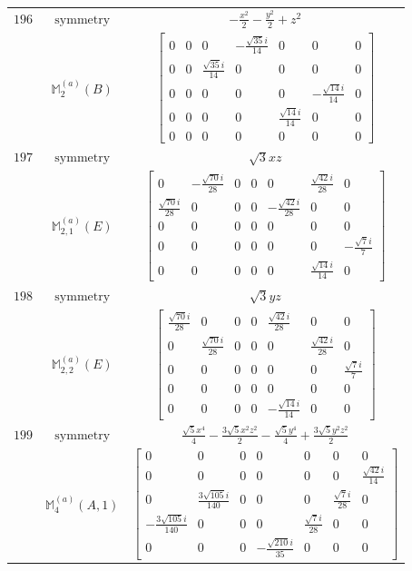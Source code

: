 \documentclass[fleqn,8pt,landscape]{jsarticle}
\begin{document}
\begin{longtable}{ccc}
$ 196 $ & $ \text{symmetry} $ & $ - \frac{x^{2}}{2} - \frac{y^{2}}{2} + z^{2} $ \\
$  $ & $ \mathbb{M}_{2}^{(a)}(B) $ & $ \begin{bmatrix} 0 & 0 & 0 & - \frac{\sqrt{35} i}{14} & 0 & 0 & 0 \\ 0 & 0 & \frac{\sqrt{35} i}{14} & 0 & 0 & 0 & 0 \\ 0 & 0 & 0 & 0 & 0 & - \frac{\sqrt{14} i}{14} & 0 \\ 0 & 0 & 0 & 0 & \frac{\sqrt{14} i}{14} & 0 & 0 \\ 0 & 0 & 0 & 0 & 0 & 0 & 0 \end{bmatrix} $ \\ \hline
$ 197 $ & $ \text{symmetry} $ & $ \sqrt{3} x z $ \\
$  $ & $ \mathbb{M}_{2,1}^{(a)}(E) $ & $ \begin{bmatrix} 0 & - \frac{\sqrt{70} i}{28} & 0 & 0 & 0 & \frac{\sqrt{42} i}{28} & 0 \\ \frac{\sqrt{70} i}{28} & 0 & 0 & 0 & - \frac{\sqrt{42} i}{28} & 0 & 0 \\ 0 & 0 & 0 & 0 & 0 & 0 & 0 \\ 0 & 0 & 0 & 0 & 0 & 0 & - \frac{\sqrt{7} i}{7} \\ 0 & 0 & 0 & 0 & 0 & \frac{\sqrt{14} i}{14} & 0 \end{bmatrix} $ \\ \hline
$ 198 $ & $ \text{symmetry} $ & $ \sqrt{3} y z $ \\
$  $ & $ \mathbb{M}_{2,2}^{(a)}(E) $ & $ \begin{bmatrix} \frac{\sqrt{70} i}{28} & 0 & 0 & 0 & \frac{\sqrt{42} i}{28} & 0 & 0 \\ 0 & \frac{\sqrt{70} i}{28} & 0 & 0 & 0 & \frac{\sqrt{42} i}{28} & 0 \\ 0 & 0 & 0 & 0 & 0 & 0 & \frac{\sqrt{7} i}{7} \\ 0 & 0 & 0 & 0 & 0 & 0 & 0 \\ 0 & 0 & 0 & 0 & - \frac{\sqrt{14} i}{14} & 0 & 0 \end{bmatrix} $ \\ \hline
$ 199 $ & $ \text{symmetry} $ & $ \frac{\sqrt{5} x^{4}}{4} - \frac{3 \sqrt{5} x^{2} z^{2}}{2} - \frac{\sqrt{5} y^{4}}{4} + \frac{3 \sqrt{5} y^{2} z^{2}}{2} $ \\
$  $ & $ \mathbb{M}_{4}^{(a)}(A,1) $ & $ \begin{bmatrix} 0 & 0 & 0 & 0 & 0 & 0 & 0 \\ 0 & 0 & 0 & 0 & 0 & 0 & \frac{\sqrt{42} i}{14} \\ 0 & \frac{3 \sqrt{105} i}{140} & 0 & 0 & 0 & \frac{\sqrt{7} i}{28} & 0 \\ - \frac{3 \sqrt{105} i}{140} & 0 & 0 & 0 & \frac{\sqrt{7} i}{28} & 0 & 0 \\ 0 & 0 & 0 & - \frac{\sqrt{210} i}{35} & 0 & 0 & 0 \end{bmatrix} $ \\ \hline

\end{longtable}
\end{document}
